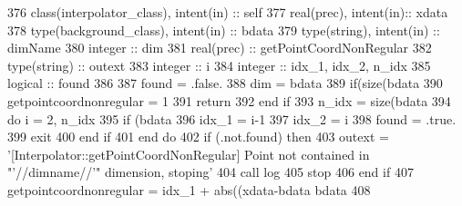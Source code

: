 \begin{DoxyCode}
376     \textcolor{keywordtype}{class}(interpolator\_class), \textcolor{keywordtype}{intent(in)} :: self
377     \textcolor{keywordtype}{real(prec)}, \textcolor{keywordtype}{intent(in)}:: xdata
378     \textcolor{keywordtype}{type}(background\_class), \textcolor{keywordtype}{intent(in)} :: bdata
379     \textcolor{keywordtype}{type}(string), \textcolor{keywordtype}{intent(in)} :: dimName
380     \textcolor{keywordtype}{integer} :: dim
381     \textcolor{keywordtype}{real(prec)} :: getPointCoordNonRegular
382     \textcolor{keywordtype}{type}(string) :: outext
383     \textcolor{keywordtype}{integer} :: i
384     \textcolor{keywordtype}{integer} :: idx\_1, idx\_2, n\_idx
385     \textcolor{keywordtype}{logical} :: found
386 
387     found = .false.
388     dim = bdata%
389     \textcolor{keywordflow}{if}(\textcolor{keyword}{size}(bdata%
390         getpointcoordnonregular = 1
391         \textcolor{keywordflow}{return}
392 \textcolor{keywordflow}{    end if}
393     n\_idx = \textcolor{keyword}{size}(bdata%
394     \textcolor{keywordflow}{do} i = 2, n\_idx
395         \textcolor{keywordflow}{if} (bdata%
396             idx\_1 = i-1
397             idx\_2 = i
398             found = .true.
399             \textcolor{keywordflow}{exit}
400 \textcolor{keywordflow}{        end if}
401 \textcolor{keywordflow}{    end do}
402     \textcolor{keywordflow}{if} (.not.found) \textcolor{keywordflow}{then}
403         outext = \textcolor{stringliteral}{'[Interpolator::getPointCoordNonRegular] Point not contained in "'}//dimname//\textcolor{stringliteral}{'" dimension,
       stoping'}
404         \textcolor{keyword}{call }log%
405         stop
406 \textcolor{keywordflow}{    end if}
407     getpointcoordnonregular = idx\_1 + abs((xdata-bdata%
      bdata%
408     
\end{DoxyCode}
\mbox{\label{namespaceinterpolator__mod_ab47cccb1adf61dcfca1b1ca5a5d213cd}} 
